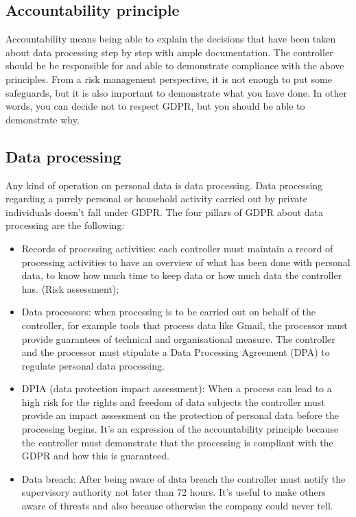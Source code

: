 \subsection{Accountability principle}
Accountability means being able to explain the decisions that have been taken about data processing step by step with ample documentation. The controller should be be responsible for and able to demonstrate compliance with the above principles. From a risk management perspective, it is not enough to put some safeguards, but it is also important to demonstrate what you have done. In other words, you can decide not to respect GDPR, but you should be able to demonstrate why.
\subsection{Data processing}
Any kind of operation on personal data is data processing. Data processing regarding a purely personal or household activity carried out by private individuals doesn't fall under GDPR. The four pillars of GDPR about data processing are the following:
\begin{itemize}
    \item Records of processing activities: each controller must maintain a record of processing activities to have an overview of what has been done with personal data, to know how much time to keep data or how much data the controller has. (Risk assessment);
    \item Data processors: when processing is to be carried out on behalf of the controller, for example tools that process data like Gmail, the processor must provide guarantees of technical and organisational measure. The controller and the processor must stipulate a Data Processing Agreement (DPA) to regulate personal data processing.
    \item DPIA (data protection impact assessment): When a process can lead to a high risk for the rights and freedom of data subjects the controller must provide an impact assessment on the protection of personal data before the processing begins. It's an expression of the accountability principle because the controller must demonstrate that the processing is compliant with the GDPR and how this is guaranteed.
    \item Data breach: After being aware of data breach the controller must notify the supervisory authority not later than 72 hours. It's useful to make others aware of threats and also because otherwise the company could never tell.
\end{itemize}

